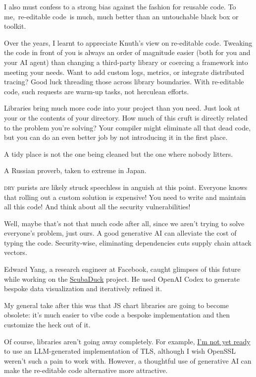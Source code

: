 \documentclass{article}
\begin{document}
\epigraph{
I also must confess to a strong bias against the fashion for reusable code. To me, re-editable code is much, much better than an untouchable black box or toolkit.
}{}

Over the years, I learnt to appreciate Knuth's view on re-editable code.
Tweaking the code in front of you is always an order of magnitude easier (both for you and your AI agent) than changing a third-party library
or coercing a framework into meeting your needs.
Want to add custom logs, metrics, or integrate distributed tracing?
Good luck threading those across library boundaries.
With re-editable code, such requests are warm-up tasks, not herculean efforts.

Libraries bring much more code into your project than you need.
Just look at your  or the contents of your  directory.
How much of this cruft is directly related to the problem you’re solving?
Your compiler might eliminate all that dead code, but you can do an even better job by not introducing it in the first place.

\epigraph{A tidy place is not the one being cleaned but the one where nobody litters.}{A Russian proverb, taken to extreme in Japan.}

\textsc{dry} purists are likely struck speechless in anguish at this point.
Everyone knows that rolling out a custom solution is expensive!
You need to write and maintain all this code! And think about all the security vulnerabilities!

Well, maybe that's not that much code after all, since we aren't trying to solve everyone's problem, just ours.
A good generative AI can alleviate the cost of typing the code.
Security-wise, eliminating dependencies cuts supply chain attack vectors.

Edward Yang, a research engineer at Facebook, caught glimpses of this future while working on the \href{https://github.com/ezyang/scubaduck}{ScubaDuck} project.
He used OpenAI Codex to generate bespoke data visualization and iteratively refined it.

\epigraph{
  My general take after this was that JS chart libraries are going to become obsolete: it's much easier to vibe code a bespoke implementation and then customize the heck out of it.
}{}

Of course, libraries aren’t going away completely.
For example, \href{https://security.stackexchange.com/questions/18197/why-shouldnt-we-roll-our-own#18198}{I’m not yet ready} to use an LLM-generated implementation of TLS,
although I wish OpenSSL weren’t such a pain to work with.
However, a thoughtful use of generative AI can make the re-editable code alternative more attractive.
\end{document}
